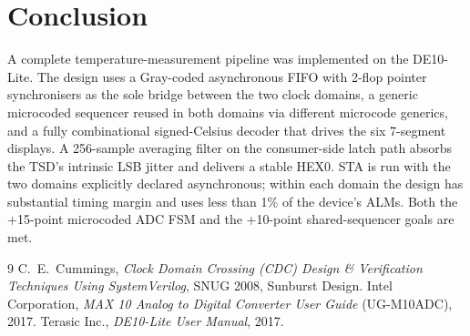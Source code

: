 \documentclass[12pt,letterpaper]{article}
\begin{document}
\section{Conclusion}

A complete temperature-measurement pipeline was implemented on the DE10-Lite.
The design uses a Gray-coded asynchronous FIFO with 2-flop pointer
synchronisers as the sole bridge between the two clock domains, a generic
microcoded sequencer reused in both domains via different microcode
generics, and a fully combinational signed-Celsius decoder that drives the
six 7-segment displays.  A 256-sample averaging filter on the consumer-side
latch path absorbs the TSD's intrinsic LSB jitter and delivers a stable
HEX0.  STA is run with the two domains explicitly declared asynchronous;
within each domain the design has substantial timing margin and uses less
than 1\% of the device's ALMs.  Both the +15-point microcoded ADC FSM and
the +10-point shared-sequencer goals are met.

\begin{thebibliography}{9}
C.~E.~Cummings, \emph{Clock Domain Crossing (CDC) Design \& Verification
Techniques Using SystemVerilog}, SNUG 2008, Sunburst Design.
Intel Corporation, \emph{MAX 10 Analog to Digital Converter User Guide}
(UG-M10ADC), 2017.
Terasic Inc., \emph{DE10-Lite User Manual}, 2017.
\end{thebibliography}
\end{document}
